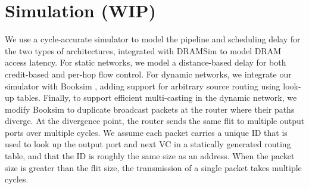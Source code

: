 \section{Simulation (WIP)}
We use a cycle-accurate simulator to model the pipeline and scheduling delay for the two types of architectures,
 integrated with DRAMSim \cite{dramsim} to model DRAM access latency. For static networks, we model
a distance-based delay for both credit-based and per-hop flow control. 
For dynamic networks, we integrate
our simulator with Booksim \cite{jiang2013detailed}, adding support for arbitrary source routing using look-up tables. 
Finally, to support efficient multi-casting in the dynamic network, we modify Booksim to duplicate broadcast packets at the router where their paths diverge.
At the divergence point, the router sends the same flit to multiple output ports over multiple cycles.
We assume each packet carries a unique ID that is used to look up the output port and next VC in a statically generated routing table, and that the ID is roughly the same size as an address.
When the packet size is greater than the flit size, the transmission of a single packet takes multiple cycles.

